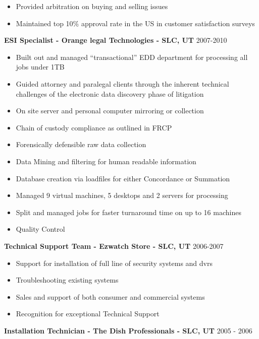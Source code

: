 \documentclass[line,margin]{res}
\begin{document}
\begin{resume}
\begin{itemize}
   \item Provided arbitration on buying and selling issues
   \item Maintained top 10\% approval rate in the US in customer satisfaction surveys
   \end{itemize}
 {\bf ESI Specialist - Orange legal Technologies - SLC, UT} \hfill 2007-2010\\
  \begin{itemize} \itemsep -2pt
  \item Built out and managed “transactional” EDD department for processing all jobs under 1TB
  \item Guided attorney and paralegal clients through the inherent technical challenges of the electronic data discovery phase of litigation
  \item On site server and personal computer mirroring or collection
  \item Chain of custody compliance as outlined in FRCP
  \item Forensically defensible raw data collection 
  \item Data Mining and filtering for human readable information
  \item Database creation via loadfiles for either Concordance or Summation
  \item Managed 9 virtual machines, 5 desktops and 2 servers for processing 
  \item Split and managed jobs for faster turnaround time on up to 16 machines
  \item Quality Control
  \end{itemize}
{\bf Technical Support Team - Ezwatch Store - SLC, UT} \hfill 2006-2007\\
  \begin{itemize} \itemsep -2pt
  \item Support for installation of full line of security systems and dvrs
  \item Troubleshooting existing systems
  \item Sales and support of both consumer and commercial systems
  \item Recognition for exceptional Technical Support
  \end{itemize} 
{\bf Installation Technician - The Dish Professionals - SLC, UT} \hfill 2005 - 2006\\
  \begin{itemize} \itemsep -2pt

\end{itemize}
\end{resume}
\end{document}
